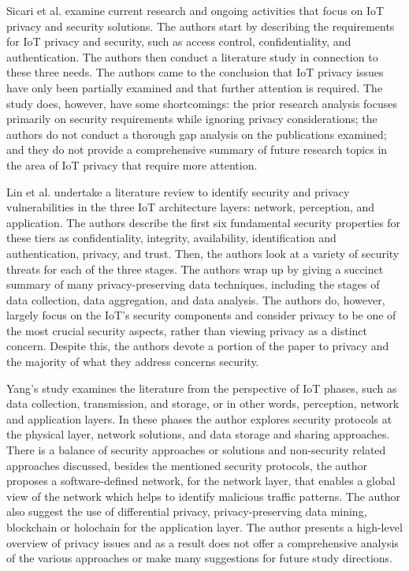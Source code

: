 Sicari et al. \cite{sicari2015security} examine current research and ongoing
activities that focus on IoT privacy and security solutions. The authors
start by describing the requirements for IoT privacy and security, such
as access control, confidentiality, and authentication. The authors then
conduct a literature study in connection to these three needs. The authors
came to the conclusion that IoT privacy issues have only been partially
examined and that further attention is required. The study does, however, have
some shortcomings: the prior research analysis focuses primarily on security
requirements while ignoring privacy considerations; the authors do not conduct
a thorough gap analysis on the publications examined; and they do not provide
a comprehensive summary of future research topics in the area of IoT privacy
that require more attention.

Lin et al. \cite{LinSurvey} undertake a literature review to identify security
and privacy vulnerabilities in the three IoT architecture layers: network,
perception, and application. The authors describe the first six fundamental
security properties for these tiers as confidentiality, integrity, availability,
identification and authentication, privacy, and trust. Then, the authors
look at a variety of security threats for each of the three stages. The
authors wrap up by giving a succinct summary of many privacy-preserving
data techniques, including the stages of data collection, data aggregation,
and data analysis. The authors do, however, largely focus on the IoT's security
components and consider privacy to be one of the most crucial security aspects,
rather than viewing privacy as a distinct concern. Despite this, the authors
devote a portion of the paper to privacy and the majority of what they address
concerns security.

Yang's study \cite{yang2022overview} examines the literature from the perspective
of IoT phases, such as data collection, transmission, and storage, or in other
words, perception, network and application layers. In these phases the author explores
security protocols at the physical layer, network solutions, and data storage and
sharing approaches. There is a balance of security approaches or solutions and
non-security related approaches discussed, besides the mentioned security protocols,
the author proposes a software-defined network, for the network layer, that enables
a global view of the network which helps to identify malicious traffic patterns. The
author also suggest the use of differential privacy, privacy-preserving data mining,
blockchain or holochain for the application layer. The author presents a high-level
overview of privacy issues and as a result does not offer a comprehensive analysis of
the various approaches or make many suggestions for future study directions.

